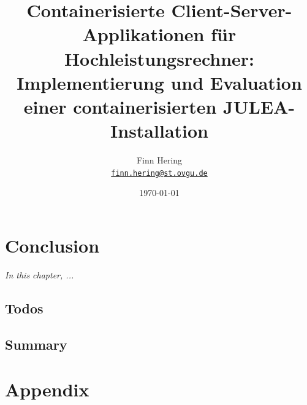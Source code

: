 \documentclass[
  12pt,
  a4paper,
  printlength,
  bibliography=totoc,
  chapterprefix,
  headings=openright,
  numbers=endperiod,
  parskip=half,
  twoside
]{scrreprt}
\title{Containerisierte Client-Server-Applikationen für Hochleistungsrechner: Implementierung und Evaluation einer containerisierten JULEA-Installation}
\author{
  Finn Hering\\
  {\large\href{mailto:finn.hering@st.ovgu.de}{\nolinkurl{finn.hering@st.ovgu.de}}}
}
\date{\today}
\begin{document}
\sloppy

{}

\maketitle

\begin{abstract}
  \lipsum[1]

\end{abstract}

\tableofcontents




\ifdraft{\cleardoubleoddpage}{}











\chapter{Conclusion}
\label{cha:conclusion}

\textit{In this chapter, ...}

\section{Todos}


\lipsum[1-2]

\section*{Summary}

\lipsum[2]

\printbibliography


\appendix

\chapter{Appendix}
\label{cha:appendix}

\chapter*{}
\end{document}
